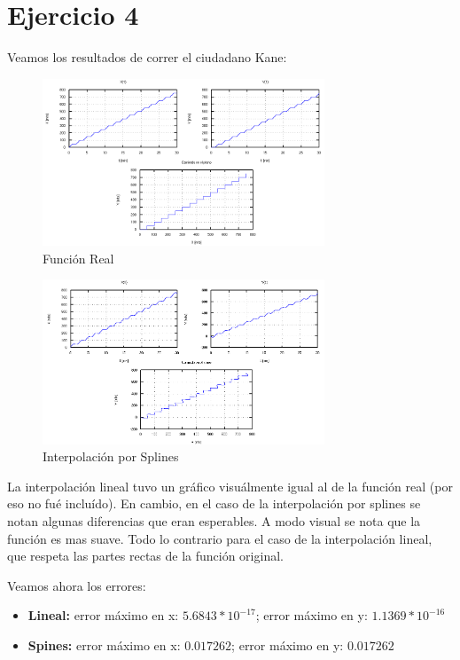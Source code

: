 \documentclass[a4paper,10pt]{article}
\begin{document}
\section{Ejercicio 4}
\par Veamos los resultados de correr el ciudadano Kane:

\FloatBarrier
\begin{figure}[h]
  \centering
    \includegraphics[width=0.75\textwidth]{imagenes/Kane_Real.png}
  \caption{Función Real}
\end{figure}
\FloatBarrier
\begin{figure}[h]
  \centering
    \includegraphics[width=0.75\textwidth]{imagenes/Kane_Splines.png}
  \caption{Interpolación por Splines}
\end{figure}
\FloatBarrier

\par La interpolación lineal tuvo un gráfico visuálmente igual al de la función real (por eso no fué incluído). En cambio, en el caso de la interpolación por splines se notan algunas diferencias que eran esperables. A modo visual se nota que la función es mas suave. Todo lo contrario para el caso de la interpolación lineal, que respeta las partes rectas de la función original.

\par Veamos ahora los errores:

\begin{itemize}
	\item \textbf{Lineal:} error máximo en x: $5.6843 * 10^{-17}$; error máximo en y: $1.1369 * 10^{-16}$
	\item \textbf{Spines:} error máximo en x: $0.017262$; error máximo en y: $0.017262$
\end{itemize}
\end{document}
